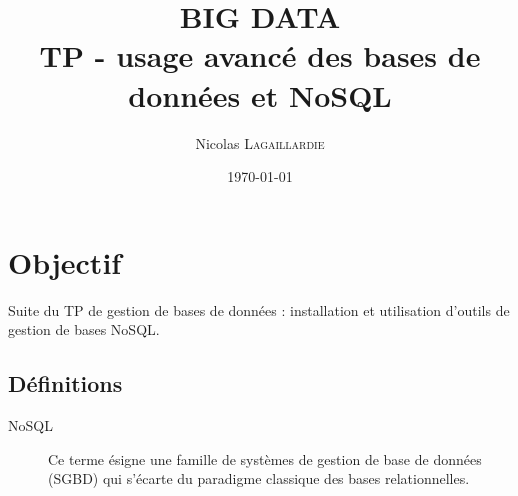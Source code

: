 \documentclass{article}
\title{BIG DATA \\ TP - usage avanc\'{e} des bases de donn\'{e}es et NoSQL} %
\author{Nicolas \textsc{Lagaillardie}} %
\date{\today} %
\begin{document}
\maketitle %




\section{Objectif}

Suite du TP de gestion de bases de donn\'{e}es : installation et utilisation d'outils de gestion de bases NoSQL.



\subsection{D\'{e}finitions}
\label{definitions}
\begin{description}
\item[NoSQL]
Ce terme \'{e}signe une famille de syst\`{e}mes de gestion de base de donn\'{e}es (SGBD) qui s'\'{e}carte du paradigme classique des bases relationnelles.
\end{description} 
 
\end{document}
